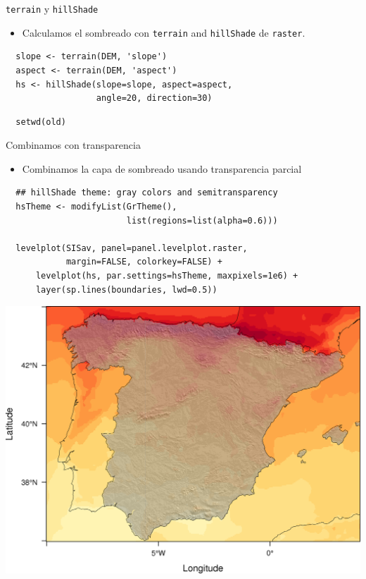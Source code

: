 \documentclass[xcolor={usenames,svgnames,dvipsnames}]{beamer}
\begin{document}
\begin{frame}[fragile,label=sec-2-3-2]{\texttt{terrain} y \texttt{hillShade}}
 \begin{itemize}
\item Calculamos el sombreado con \texttt{terrain} and \texttt{hillShade} de \texttt{raster}.
\end{itemize}

\lstset{language=R,label= ,caption= ,numbers=none}
\begin{lstlisting}
  slope <- terrain(DEM, 'slope')
  aspect <- terrain(DEM, 'aspect')
  hs <- hillShade(slope=slope, aspect=aspect,
                  angle=20, direction=30)
\end{lstlisting}

\lstset{language=R,label= ,caption= ,numbers=none}
\begin{lstlisting}
  setwd(old)
\end{lstlisting}
\end{frame}

\begin{frame}[fragile,label=sec-2-3-3]{Combinamos con transparencia}
 \begin{itemize}
\item Combinamos la capa de sombreado usando transparencia parcial
\end{itemize}

\lstset{language=R,label= ,caption= ,numbers=none}
\begin{lstlisting}
  ## hillShade theme: gray colors and semitransparency
  hsTheme <- modifyList(GrTheme(),
                        list(regions=list(alpha=0.6)))
  
  levelplot(SISav, panel=panel.levelplot.raster,
            margin=FALSE, colorkey=FALSE) +
      levelplot(hs, par.settings=hsTheme, maxpixels=1e6) +
      layer(sp.lines(boundaries, lwd=0.5))
\end{lstlisting}
\end{frame}

\begin{frame}[label=sec-2-3-4]{}
\includegraphics[width=.9\linewidth]{figs/hillShading.png}
\end{frame}
\end{document}
